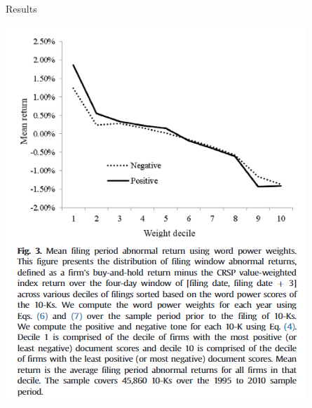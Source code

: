 \documentclass[english]{beamer}
\begin{document}
\begin{frame}{Results}
\vspace{-7pt}
\begin{center}
\includegraphics[scale=0.60]{Images/jegadeesh2013-3.png}
\end{center}
\end{frame}
\end{document}
